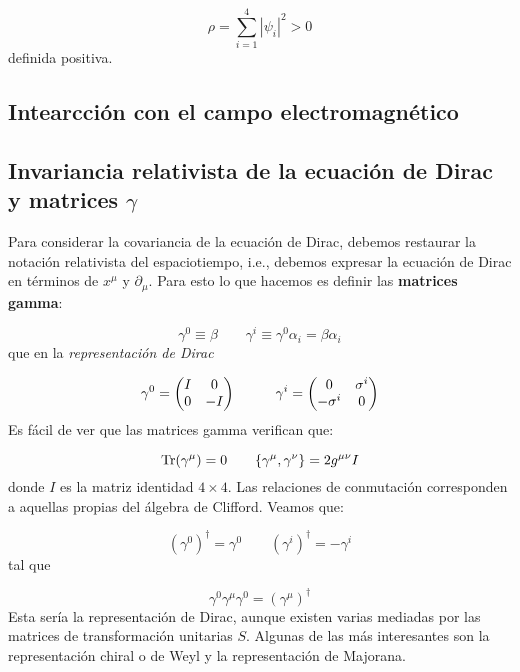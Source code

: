 \begin{equation}
	\rho = \sum_{i=1}^4 |\psi_i|^2 > 0
\end{equation}
definida positiva. 


\subsection{Intearcción con el campo electromagnético}

\subsection{Invariancia relativista de la ecuación de Dirac y matrices $\gamma$}

Para considerar la covariancia de la ecuación de Dirac, debemos restaurar la notación relativista del espaciotiempo, i.e., debemos expresar la ecuación de Dirac en términos de $x^\mu$ y $\partial_\mu$. Para esto lo que hacemos es definir las \textbf{matrices gamma}:

\begin{equation}
	\gamma^0 \equiv \beta \qquad \gamma^i \equiv \gamma^0 \alpha_i = \beta \alpha_i
\end{equation}
que en la \textit{representación de Dirac}

\begin{equation}
	\gamma^0 = \mqty(I & 0 \\ 0 & - I) \tquad \gamma^i = \mqty(0 & \sigma^i \\ - \sigma^i & 0)
\end{equation}
Es fácil de ver que las matrices gamma verifican que:

\begin{equation}
	\Tr (\gamma^\mu) = 0 \qquad \{\gamma^\mu , \gamma^\nu \} = 2 g^{\mu \nu} I
\end{equation}
donde $I$ es la matriz identidad $4\times4$. Las relaciones de conmutación corresponden a aquellas propias del álgebra de Clifford. Veamos que:

\begin{equation}
	(\gamma^0)^\dagger = \gamma^0  \qquad (\gamma^i)^\dagger = - \gamma^i
\end{equation}
tal que 

\begin{equation}
	\gamma^0 \gamma^\mu \gamma^0 = (\gamma^\mu)^\dagger
\end{equation}
Esta sería la representación de Dirac, aunque existen varias mediadas por las matrices de transformación unitarias $S$. Algunas de las más interesantes son la representación chiral o de Weyl y la representación de Majorana. 

